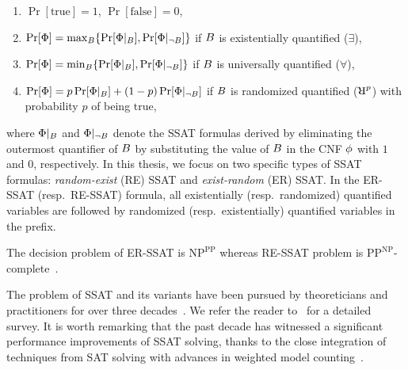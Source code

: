 \begin{enumerate}
	\item $ \Pr[\text{true}] = 1 $,  $ \Pr[\text{false}] = 0 $, 
	\item $ \Pr [\Phi] = \max_{B} \{\Pr[\Phi|_{B}], \Pr[\Phi|_{\neg B}]\}$ if $ B $ is existentially quantified ($ \exists $), 
	\item $ \Pr [\Phi] = \min_{B} \{\Pr[\Phi|_{B}], \Pr[\Phi|_{\neg B}]\} $ if $ B $ is universally quantified ($ \forall $), 
	\item $ \Pr [\Phi] = p\Pr[\Phi|_{B}] + (1-p) \Pr[\Phi|_{\neg B}] $ if $ B $ is randomized quantified ($\R^{p}$) with probability $p$ of being $\text{true}$,
\end{enumerate}

where $ \Phi|_{B} $ and $ \Phi|_{\neg B} $ denote the SSAT formulas derived by eliminating the outermost quantifier of $ B $  by substituting the value of $ B $ in the CNF $ \phi $ with $ 1 $ and $ 0 $, respectively. In this thesis, we focus on two specific types of SSAT formulas:  \textit{random-exist} (RE) SSAT and \textit{exist-random} (ER) SSAT. In the ER-SSAT (resp.\ RE-SSAT) formula, all existentially (resp.\ randomized) quantified variables are followed by randomized (resp.\ existentially) quantified variables in the prefix.


\begin{remark}
	The decision problem of ER-SSAT is $\mathrm{NP}^{\mathrm{PP}}$ whereas RE-SSAT problem is $\mathrm{PP}^{\mathrm{NP}}$-complete~\cite{littman2001stochastic}.
\end{remark}



The problem of SSAT and its variants have been pursued by theoreticians and practitioners for over three decades~\cite{majercik2005dc,fremont2017maximum,huang2006combining}. We refer the reader to~\cite{lee2017solving,lee2018solving} for a detailed survey. It is worth remarking that the past decade has witnessed a significant performance improvements of SSAT solving, thanks to the close integration of techniques from SAT solving with advances in weighted model counting~\cite{sang2004combining,chakraborty2013scalable,chakraborty2014distribution}. 


